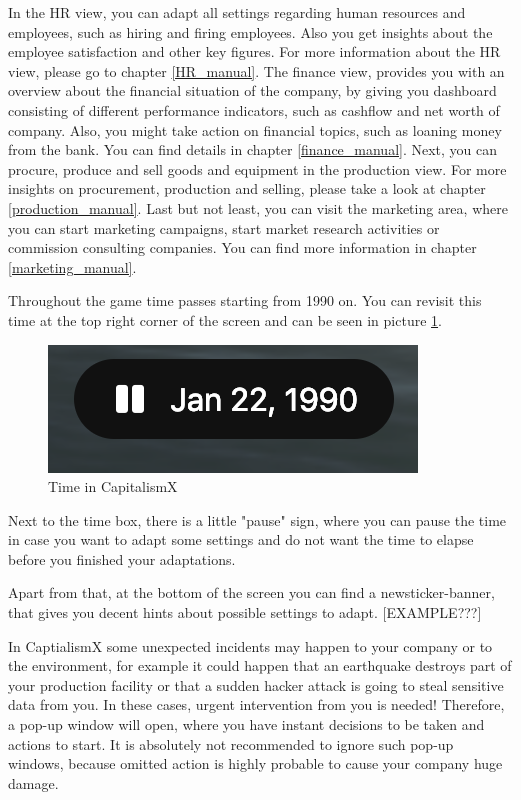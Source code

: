 \documentclass[11pt,titlepage,oneside,openany]{book}
\begin{document}
In the HR view, you can adapt all settings regarding human resources and employees, such as hiring and firing employees. Also you get insights about the employee satisfaction and other key figures. For more information about the HR view, please go to chapter \ref{HR_manual}.
The finance view, provides you with an overview about the financial situation of the company, by giving you dashboard consisting of different performance indicators, such as cashflow and net worth of company. Also, you might take action on financial topics, such as loaning money from the bank. You can find details in chapter \ref{finance_manual}.
Next, you can procure, produce and sell goods and equipment in the production view. For more insights on procurement, production and selling, please take a look at chapter \ref{production_manual}. 
Last but not least, you can visit the marketing area, where you can start marketing campaigns, start market research activities or commission consulting companies. You can find more information in chapter \ref{marketing_manual}.

Throughout the game time passes starting from 1990 on. You can revisit this time at the top right corner of the screen and can be seen in picture \ref{fig:time}.
\begin{figure} [!htbp]
    \centering
    \includegraphics{images/time.png}
    \caption{Time in CapitalismX}
    \label{fig:time}
\end{figure}
Next to the time box, there is a little "pause" sign, where you can pause the time in case you want to adapt some settings and do not want the time to elapse before you finished your adaptations.

Apart from that, at the bottom of the screen you can find a newsticker-banner, that gives you decent hints about possible settings to adapt. [EXAMPLE???]%

In CaptialismX some unexpected incidents may happen to your company or to the environment, for example it could happen that an earthquake destroys part of your production facility or that a sudden hacker attack is going to steal sensitive data from you. In these cases, urgent intervention from you is needed! Therefore, a pop-up window will open, where you have instant decisions to be taken and actions to start. It is absolutely not recommended to ignore such pop-up windows, because omitted action is highly probable to cause your company huge damage.
\end{document}
